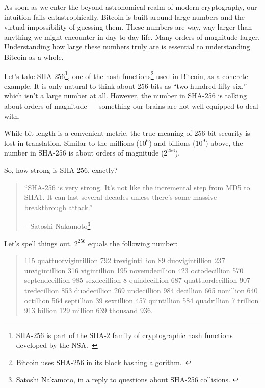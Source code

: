 As soon as we enter the beyond-astronomical realm of modern
cryptography, our intuition fails catastrophically. Bitcoin is built
around large numbers and the virtual impossibility of guessing them.
These numbers are way, way larger than anything we might encounter in
day-to-day life. Many orders of magnitude larger. Understanding how
large these numbers truly are is essential to understanding Bitcoin as a
whole.

Let's take SHA-256\footnote{SHA-256 is part of the SHA-2 family of cryptographic
hash functions developed by the NSA.~\cite{wiki:sha2}}, one of the hash
functions\footnote{Bitcoin uses SHA-256 in its block hashing
algorithm.~\cite{btcwiki:block-hashing}} used in Bitcoin, as a concrete example.
It is only natural to think about 256 bits as \enquote{two hundred fifty-six,} which
isn't a large number at all. However, the number in SHA-256 is talking about
orders of magnitude --- something our brains are not well-equipped to deal with.

While bit length is a convenient metric, the true meaning of 256-bit
security is lost in translation. Similar to the millions ($10^6$) and
billions ($10^9$) above, the number in SHA-256 is about orders of magnitude
($2^{256}$).

So, how strong is SHA-256, exactly?

\begin{quotation}\begin{samepage}
\enquote{SHA-256 is very strong. It's not like the incremental step from MD5
to SHA1. It can last several decades unless there's some massive
breakthrough attack.}
\begin{flushright} -- Satoshi Nakamoto\footnote{Satoshi Nakamoto, in a reply to questions about SHA-256 collisions. \cite{satoshi-sha256}}
\end{flushright}\end{samepage}\end{quotation}

Let's spell things out. $2^{256}$ equals the following number:

\begin{quotation}\begin{samepage}
    115 quattuorvigintillion 792 trevigintillion 89 duovigintillion 237
    unvigintillion 316 vigintillion 195 novemdecillion 423 octodecillion 570
    septendecillion 985 sexdecillion 8 quindecillion 687 quattuordecillion 907
    tredecillion 853 duodecillion 269 undecillion 984 decillion 665 nonillion
    640 octillion 564 septillion 39 sextillion 457 quintillion 584 quadrillion 7
    trillion 913 billion 129 million 639 thousand 936.
\end{samepage}\end{quotation}

